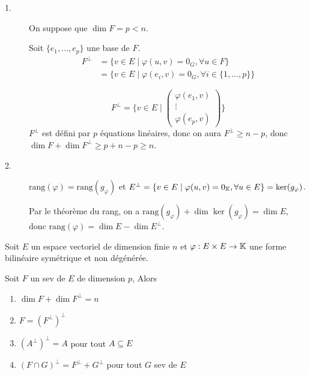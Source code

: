 \documentclass[a4paper,12pt]{article}
\begin{document}
\begin{demonstration}
    \begin{description}
        \item[1.]
        On suppose que $\dim F = p < n$.

        Soit $\{e_1, \dots, e_p\}$ une base de $F$.
        \begin{align*}
            F^\perp &= \{v \in E \mid \varphi(u, v) = 0_G, \forall u \in F\} \\
            &= \{v \in E \mid \varphi(e_i, v) = 0_G, \forall i \in \{1, \dots, p\}\}
        \end{align*}

        $$
        F^\perp = \{v \in E \mid \begin{pmatrix}
            \varphi(e_1, v) \\
            \vdots \\
            \varphi(e_p, v)
        \end{pmatrix}
        \}
        $$
        $F^\perp$ est défini par $p$ équations linéaires, donc on aura $F^\perp \geq n - p$,
        donc $\dim F + \dim F^\perp \geq p + n - p \geq n$.

        \item[2.]
        $\text{rang}(\varphi) = \text{rang}(g_\varphi)$ et $E^\perp = \{ v \in E \mid \varphi(u, v) = 0_{\mathbb{K}}, \forall u \in E\} = \ker(g_\varphi)$.

        Par le théorème du rang, on a $\text{rang}(g_\varphi) + \dim \ker(g_\varphi) = \dim E$, donc $\text{rang}(\varphi) = \dim E - \dim E^\perp$.
    \end{description}
\end{demonstration}

\begin{proposition}{}{}
    Soit $E$ un espace vectoriel de dimension finie $n$ et $\varphi: E \times E \to \mathbb{K}$ une forme bilinéaire symétrique et non dégénérée.

    Soit $F$ un sev de $E$ de dimension $p$,
    Alors
    \begin{enumerate}
        \item $\dim F + \dim F^\perp = n$
        \item $F = (F^\perp)^\perp$
        \item $(A^\perp)^\perp = A$ pour tout $A \subseteq E$
        \item $(F \cap G)^\perp = F^\perp + G^\perp$ pour tout $G$ sev de $E$
    \end{enumerate}
\end{proposition}
\end{document}
